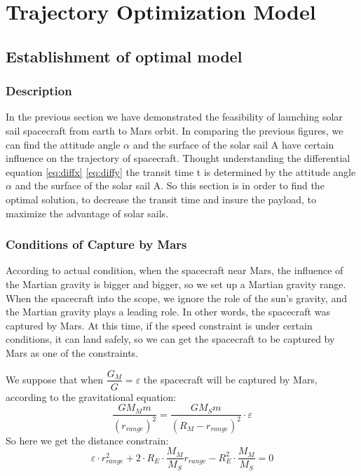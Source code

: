 \documentclass[../Paper.tex]{subfiles}
\begin{document}
\section{Trajectory Optimization Model}

\subsection{Establishment of optimal model}

\subsubsection{Description}

In the previous section we have demonstrated the feasibility of launching solar sail spacecraft from earth to Mars orbit. In comparing the previous figures, we can find the attitude angle $\alpha$ and the surface of the solar sail A have certain influence on the trajectory of spacecraft. Thought understanding the differential equation \eqref{eq:diffx} \eqref{eq:diffy} the transit time t is determined by the attitude angle $\alpha$ and the surface of the solar sail A. So this section is in order to find the optimal solution, to decrease the transit time and insure the payload, to maximize the advantage of solar sails.

\subsubsection{Conditions of Capture by Mars}
According to actual condition, when the spacecraft near Mars, the influence of the Martian gravity is bigger and bigger, so we set up a Martian gravity range. When the spacecraft into the scope, we ignore the role of the sun's gravity, and the Martian gravity plays a leading role. In other words, the spacecraft was captured by Mars.  At this time, if the speed constraint is under certain conditions, it can land safely, so we can get the spacecraft to be captured by Mars as one of the constraints.

We suppose that when $ \dfrac{G_M}{G} = \varepsilon $ the spacecraft will be captured by Mars, according to the gravitational equation:
\begin{equation*}
\frac{G M_{M} m}{(r_{range})^2} = \frac{GM_{S}m}{ (R_{M}-r_{range})^2} \cdot \varepsilon
\end{equation*}
So here we get the distance constrain:
\begin{equation*}
\varepsilon \cdot r_{range}^2 + 2\cdot R_{E} \cdot \dfrac{M_{M}}{M_{S}} r_{range} - R_{E}^2 \cdot \dfrac{M_{M}}{M_{S}} = 0
\end{equation*}
\end{document}
